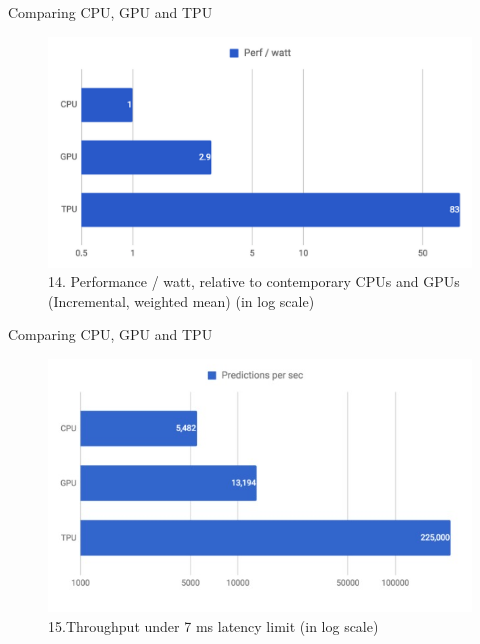 \documentclass[c]{beamer}
\begin{document}
	\begin{frame}{Comparing CPU, GPU and TPU}
	\begin{figure}
            \centering
            \includegraphics[scale=.36]{images/14pre.png}
            \caption{14. Performance / watt, relative to contemporary CPUs and GPUs (Incremental, weighted mean) (in log scale) }
            \label{graph:performance per watt}
        \end{figure}
	    
	\end{frame}
	\begin{frame}{Comparing CPU, GPU and TPU}
	\begin{figure}
            \centering
            \includegraphics[scale=.65]{images/15pre.png}
            \caption{15.Throughput under 7 ms latency limit (in log scale) }
            \label{graph:prediction per sec}
        \end{figure}
	    
	\end{frame}
	
\end{document}
